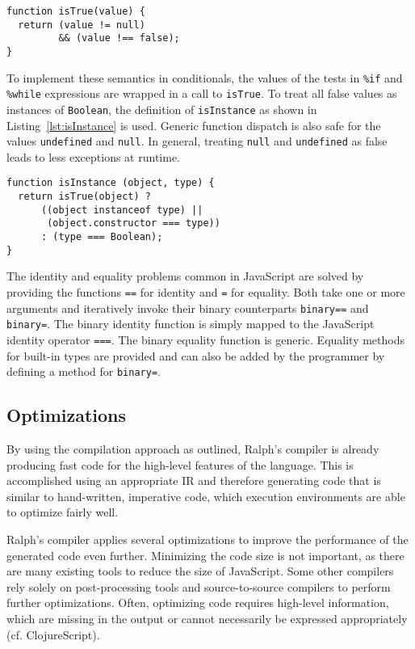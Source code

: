 \documentclass{acm_proc_article-sp}
\begin{document}
\begin{lstlisting}[label=lst:isTrue,caption=Determining truth]
function isTrue(value) {
  return (value != null)
         && (value !== false);
}
\end{lstlisting}

To implement these semantics in conditionals, the values of the tests
in \texttt{\%if} and \texttt{\%while} expressions are wrapped in a
call to \texttt{isTrue}. To treat all false values as instances of
\texttt{Boolean}, the definition of \texttt{isInstance} as shown in
Listing~\ref{lst:isInstance} is used. Generic function dispatch is
also safe for the values \texttt{undefined} and \texttt{null}. In
general, treating \texttt{null} and \texttt{undefined} as false leads
to less exceptions at runtime.

\begin{lstlisting}[label=lst:isInstance,caption=Determining if
    \texttt{object} is an instance of \texttt{type}]
function isInstance (object, type) {
  return isTrue(object) ?
      ((object instanceof type) ||
       (object.constructor === type))
      : (type === Boolean);
}
\end{lstlisting}


The identity and equality problems common in JavaScript are solved by
providing the functions \texttt{==} for identity and \texttt{=} for
equality. Both take one or more arguments and iteratively invoke their
binary counterparts \texttt{binary==} and \texttt{binary=}. The binary
identity function is simply mapped to the JavaScript identity operator
\texttt{===}. The binary equality function is generic. Equality
methods for built-in types are provided and can also be added by
the programmer by defining a method for \texttt{binary=}.

\subsection{Optimizations}

By using the compilation approach as outlined, Ralph's compiler
is already producing fast code for the high-level features of the
language. This is accomplished using an appropriate IR and therefore
generating code that is similar to hand-written, imperative code,
which execution environments are able to optimize fairly well.

Ralph's compiler applies several optimizations to improve the
performance of the generated code even further. Minimizing the code
size is not important, as there are many existing tools to reduce the
size of JavaScript. Some other compilers rely solely on
post-processing tools and source-to-source compilers to perform
further optimizations. Often, optimizing code requires high-level
information, which are missing in the output or cannot necessarily be
expressed appropriately (cf. ClojureScript).
\end{document}
